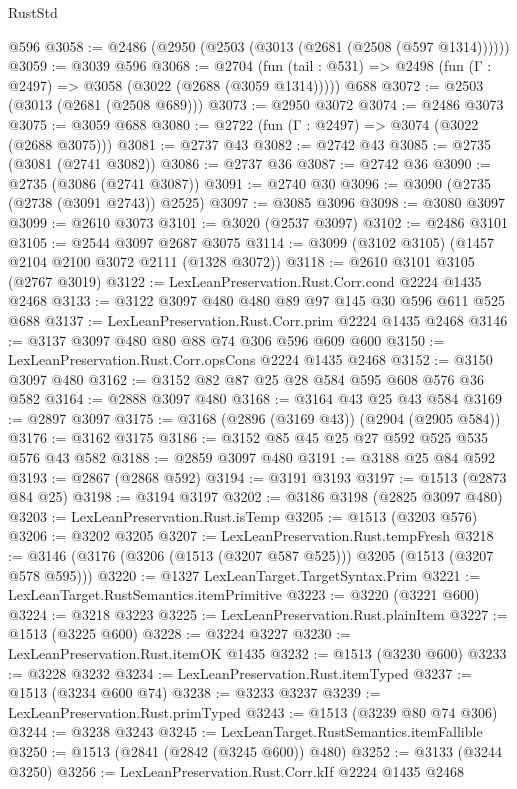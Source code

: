 \begin{lexlean}{RustStd}
\begin{coremodule}
    @596
@3058 := @2486 (@2950 (@2503 (@3013 (@2681 (@2508 (@597 @1314))))))
@3059 := @3039 @596
@3068 := @2704
    (fun (tail : @531) => @2498 (fun (Γ : @2497) => @3058 (@3022 (@2688 (@3059 @1314)))))
    @688
@3072 := @2503 (@3013 (@2681 (@2508 @689)))
@3073 := @2950 @3072
@3074 := @2486 @3073
@3075 := @3059 @688
@3080 := @2722 (fun (Γ : @2497) => @3074 (@3022 (@2688 @3075)))
@3081 := @2737 @43
@3082 := @2742 @43
@3085 := @2735 (@3081 (@2741 @3082))
@3086 := @2737 @36
@3087 := @2742 @36
@3090 := @2735 (@3086 (@2741 @3087))
@3091 := @2740 @30
@3096 := @3090 (@2735 (@2738 (@3091 @2743)) @2525)
@3097 := @3085 @3096
@3098 := @3080 @3097
@3099 := @2610 @3073
@3101 := @3020 (@2537 @3097)
@3102 := @2486 @3101
@3105 := @2544 @3097 @2687 @3075
@3114 := @3099 (@3102 @3105) (@1457 @2104 @2100 @3072 @2111 (@1328 @3072))
@3118 := @2610 @3101 @3105 (@2767 @3019)
@3122 := LexLeanPreservation.Rust.Corr.cond @2224 @1435 @2468
@3133 := @3122 @3097 @480 @480 @89 @97 @145 @30 @596 @611 @525 @688
@3137 := LexLeanPreservation.Rust.Corr.prim @2224 @1435 @2468
@3146 := @3137 @3097 @480 @80 @88 @74 @306 @596 @609 @600
@3150 := LexLeanPreservation.Rust.Corr.opsCons @2224 @1435 @2468
@3152 := @3150 @3097 @480
@3162 := @3152 @82 @87 @25 @28 @584 @595 @608 @576 @36 @582
@3164 := @2888 @3097 @480
@3168 := @3164 @43 @25 @43 @584
@3169 := @2897 @3097
@3175 := @3168 (@2896 (@3169 @43)) (@2904 (@2905 @584))
@3176 := @3162 @3175
@3186 := @3152 @85 @45 @25 @27 @592 @525 @535 @576 @43 @582
@3188 := @2859 @3097 @480
@3191 := @3188 @25 @84 @592
@3193 := @2867 (@2868 @592)
@3194 := @3191 @3193
@3197 := @1513 (@2873 @84 @25)
@3198 := @3194 @3197
@3202 := @3186 @3198 (@2825 @3097 @480)
@3203 := LexLeanPreservation.Rust.isTemp
@3205 := @1513 (@3203 @576)
@3206 := @3202 @3205
@3207 := LexLeanPreservation.Rust.tempFresh
@3218 := @3146 (@3176 (@3206 (@1513 (@3207 @587 @525))) @3205 (@1513 (@3207 @578 @595)))
@3220 := @1327 LexLeanTarget.TargetSyntax.Prim
@3221 := LexLeanTarget.RustSemantics.itemPrimitive
@3223 := @3220 (@3221 @600)
@3224 := @3218 @3223
@3225 := LexLeanPreservation.Rust.plainItem
@3227 := @1513 (@3225 @600)
@3228 := @3224 @3227
@3230 := LexLeanPreservation.Rust.itemOK @1435
@3232 := @1513 (@3230 @600)
@3233 := @3228 @3232
@3234 := LexLeanPreservation.Rust.itemTyped
@3237 := @1513 (@3234 @600 @74)
@3238 := @3233 @3237
@3239 := LexLeanPreservation.Rust.primTyped
@3243 := @1513 (@3239 @80 @74 @306)
@3244 := @3238 @3243
@3245 := LexLeanTarget.RustSemantics.itemFallible
@3250 := @1513 (@2841 (@2842 (@3245 @600)) @480)
@3252 := @3133 (@3244 @3250)
@3256 := LexLeanPreservation.Rust.Corr.kIf @2224 @1435 @2468

\end{coremodule}
\end{lexlean}
